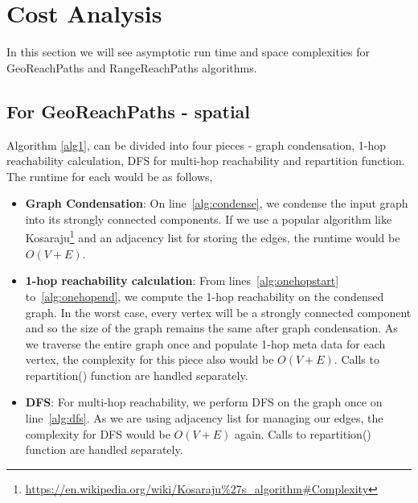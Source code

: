 \section{Cost Analysis}

In this section we will see asymptotic run time and space complexities for GeoReachPaths and RangeReachPaths algorithms.

\subsection{For GeoReachPaths - spatial}
Algorithm \ref{alg1}, can be divided into four pieces - graph condensation, 1-hop reachability calculation, DFS for multi-hop reachability and repartition function. The runtime for each would be as follows,
\begin{itemize}
  \item \textbf{Graph Condensation}: On line~\ref{alg:condense}, we condense the input graph into its strongly connected components. If we use a popular algorithm like Kosaraju\footnote{\url{https://en.wikipedia.org/wiki/Kosaraju\%27s\_algorithm\#Complexity}} and an adjacency list for storing the edges, the runtime would be $O(V + E)$.

  \item \textbf{1-hop reachability calculation}: From lines~\ref{alg:onehopstart} to~\ref{alg:onehopend}, we compute the 1-hop reachability on the condensed graph. In the worst case, every vertex will be a strongly connected component and so the size of the graph remains the same after graph condensation. As we traverse the entire graph once and populate 1-hop meta data for each vertex, the complexity for this piece also would be $O(V + E)$. Calls to repartition() function are handled separately.

  \item \textbf{DFS}: For multi-hop reachability, we perform DFS on the graph once on line~\ref{alg:dfs}. As we are using adjacency list for managing our edges, the complexity for DFS would be $O(V + E)$ again. Calls to repartition() function are handled separately.


\end{itemize}
